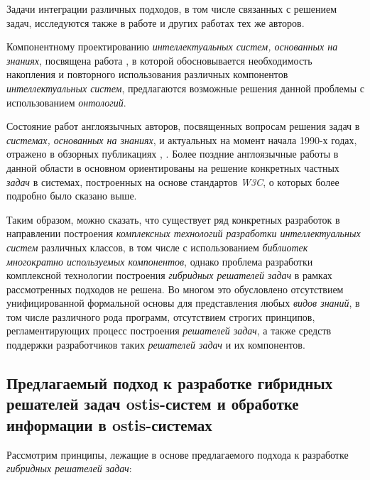 Задачи интеграции различных подходов, в том числе связанных с решением задач, исследуются также в работе  и других работах тех же авторов.

Компонентному проектированию \textit{интеллектуальных систем, основанных на знаниях}, посвящена работа , в которой обосновывается необходимость накопления и повторного использования различных компонентов \textit{интеллектуальных систем}, предлагаются возможные решения данной проблемы с использованием \textit{онтологий}.

Состояние работ англоязычных авторов, посвященных вопросам решения задач в \textit{системах, основанных на знаниях}, и актуальных на момент начала 1990-х годах, отражено в обзорных публикациях , . Более поздние англоязычные работы в данной области в основном ориентированы на решение конкретных частных \textit{задач} в системах, построенных на основе стандартов \textit{W3C}, о которых более подробно было сказано выше.

Таким образом, можно сказать, что существует ряд конкретных разработок в направлении построения \textit{комплексных технологий разработки интеллектуальных систем} различных классов, в том числе с использованием \textit{библиотек многократно используемых компонентов}, однако проблема разработки комплексной технологии построения \textit{гибридных решателей задач} в рамках рассмотренных подходов не решена. Во многом это обусловлено отсутствием унифицированной формальной основы для представления любых \textit{видов знаний}, в том числе различного рода программ, отсутствием строгих принципов, регламентирующих процесс построения \textit{решателей задач}, а также средств поддержки разработчиков таких \textit{решателей задач} и их компонентов.

\subsection{Предлагаемый подход к разработке гибридных решателей задач ostis-систем и обработке информации в ostis-системах}
\label{subsec_ps_proposed_approach}

Рассмотрим принципы, лежащие в основе предлагаемого подхода к разработке \textit{гибридных решателей задач}:

